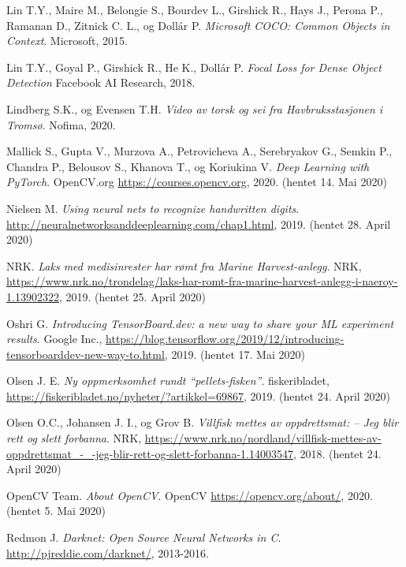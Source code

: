 \documentclass[11ot]{article}
\begin{document}
\begin{thebibliography}{9}
Lin T.Y., Maire M., Belongie S., Bourdev L., Girshick R., Hays J., Perona P., Ramanan D., Zitnick C. L., og Dollár P. 
\textit{Microsoft COCO: Common Objects in Context}. 
Microsoft, 2015.

Lin T.Y., Goyal P., Girshick R., He K., Dollár P.
\textit{Focal Loss for Dense Object Detection}
Facebook AI Research, 2018.

Lindberg S.K., og Evensen T.H.
\textit{Video av torsk og sei fra Havbruksstasjonen i Tromsø}. 
Nofima, 2020.

Mallick S., Gupta V., Murzova A., Petrovicheva A., Serebryakov G., Semkin P., Chandra P., Belousov S., Khanova T., og Koriukina V.
\textit{Deep Learning with PyTorch}. 
OpenCV.org \url{https://courses.opencv.org}, 2020. (hentet 14. Mai 2020)

Nielsen M. 
\textit{Using neural nets to recognize handwritten digits}. 
\url{http://neuralnetworksanddeeplearning.com/chap1.html}, 2019. (hentet 28. April 2020)

NRK. 
\textit{Laks med medisinrester har rømt fra Marine Harvest-anlegg}. 
NRK, \url{https://www.nrk.no/trondelag/laks-har-romt-fra-marine-harvest-anlegg-i-naeroy-1.13902322}, 2019. (hentet 25. April 2020)

Oshri G. 
\textit{Introducing TensorBoard.dev: a new way to share your ML experiment results}. 
Google Inc., \url{https://blog.tensorflow.org/2019/12/introducing-tensorboarddev-new-way-to.html}, 2019. (hentet 17. Mai 2020)

Olsen J. E. 
\textit{Ny oppmerksomhet rundt “pellets-fisken”}. 
fiskeribladet, \url{https://fiskeribladet.no/nyheter/?artikkel=69867}, 2019. (hentet 24. April 2020)

Olsen O.C., Johansen J. I., og Grov B. 
\textit{Villfisk mettes av oppdrettsmat: – Jeg blir rett og slett forbanna}. 
NRK, \url{https://www.nrk.no/nordland/villfisk-mettes-av-oppdrettsmat_-_-jeg-blir-rett-og-slett-forbanna-1.14003547}, 2018. (hentet 24. April 2020)

OpenCV Team. 
\textit{About OpenCV}. 
OpenCV \url{https://opencv.org/about/}, 2020. (hentet 5. Mai 2020)

Redmon J. 
\textit{Darknet: Open Source Neural Networks in C}. 
\url{http://pjreddie.com/darknet/}, 2013-2016.


\end{thebibliography}
\end{document}
